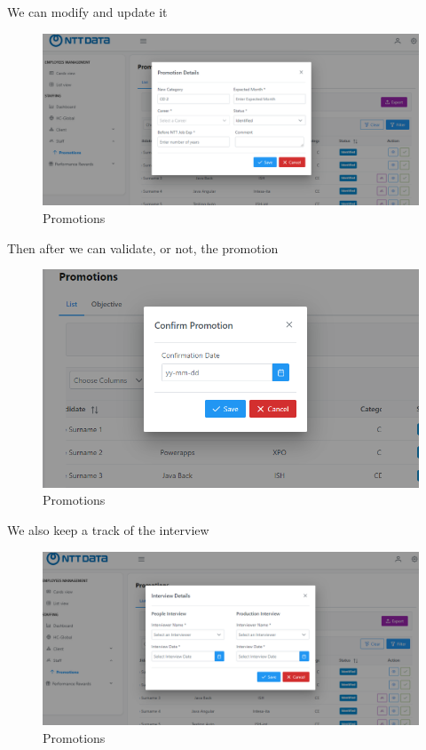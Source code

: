 \documentclass[12pt,a4paper,table,english]{article}
\begin{document}
	We can modify and update it
	\begin{figure}[H]
		\centering
		\includegraphics[width=150mm]{Image/promotiondetails}
		\caption{Promotions}
		\label{fig:Promotions}
	\end{figure}

	Then after we can validate, or not, the promotion

	\begin{figure}[H]
		\centering
		\includegraphics[width=150mm]{Image/promotionconfirm}
		\caption{Promotions}
		\label{fig:Promotions}
	\end{figure}

	We also keep a track of the interview
	\begin{figure}[H]
		\centering
		\includegraphics[width=150mm]{Image/promotioninterview}
		\caption{Promotions}
		\label{fig:Promotions}
	\end{figure}
\end{document}
